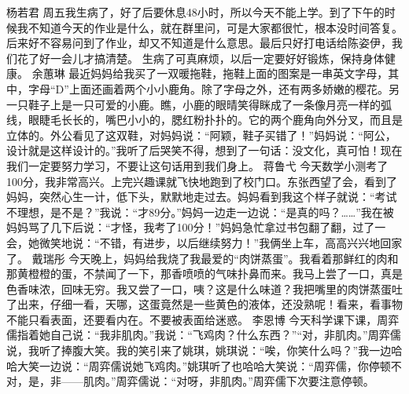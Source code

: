 {}\markdownRendererInterblockSeparator
{}杨若君\markdownRendererInterblockSeparator
{}周五我生病了，好了后要休息48小时，所以今天不能上学。到了下午的时候我不知道今天的作业是什么，就在群里问，可是大家都很忙，根本没时间答复。后来好不容易问到了作业，却又不知道是什么意思。最后只好打电话给陈姿伊，我们花了好一会儿才搞清楚。\markdownRendererInterblockSeparator
{}生病了可真麻烦，以后一定要好好锻炼，保持身体健康。\markdownRendererInterblockSeparator
{}\markdownRendererInterblockSeparator
{}余蕙琳\markdownRendererInterblockSeparator
{}最近妈妈给我买了一双暖拖鞋，拖鞋上面的图案是一串英文字母，其中，字母“D”上面还画着两个小小鹿角。除了字母之外，还有两多娇嫩的樱花。另一只鞋子上是一只可爱的小鹿。瞧，小鹿的眼晴笑得眯成了一条像月亮一样的弧线，眼睫毛长长的，嘴巴小小的，腮红粉扑扑的。它的两个鹿角向外分叉，而且是立体的。外公看见了这双鞋，对妈妈说：“阿颖，鞋子买错了！”妈妈说：“阿公，设计就是这样设计的。”我听了后哭笑不得，想到了一句话：没文化，真可怕！现在我们一定要努力学习，不要让这句话用到我们身上。\markdownRendererInterblockSeparator
{}\markdownRendererInterblockSeparator
{}蒋鲁弋\markdownRendererInterblockSeparator
{}今天数学小测考了100分，我非常高兴。上完兴趣课就飞快地跑到了校门口。东张西望了会，看到了妈妈，突然心生一计，低下头，默默地走过去。妈妈看到我这个样子就说：“考试不理想，是不是？”我说：“才89分。”妈妈一边走一边说：“是真的吗？……”我在被妈妈骂了几下后说：“才怪，我考了100分！”妈妈急忙拿过书包翻了翻，过了一会，她微笑地说：“不错，有进步，以后继续努力！”我俩坐上车，高高兴兴地回家了。\markdownRendererInterblockSeparator
{}\markdownRendererInterblockSeparator
{}戴瑞彤\markdownRendererInterblockSeparator
{}今天晚上，妈妈给我烧了我最爱的“肉饼蒸蛋”。我看着那鲜红的肉和那黄橙橙的蛋，不禁闻了一下，那香喷喷的气味扑鼻而来。我马上尝了一口，真是色香味浓，回味无穷。我又尝了一口，咦？这是什么味道？我把嘴里的肉饼蒸蛋吐了出来，仔细一看，天哪，这蛋竟然是一些黄色的液体，还没熟呢！看来，看事物不能只看表面，还要看内在。不要被表面给迷惑。\markdownRendererInterblockSeparator
{}\markdownRendererInterblockSeparator
{}李恩博\markdownRendererInterblockSeparator
{}今天科学课下课，周弈儒指着她自己说：“我非肌肉。”我说：“飞鸡肉？什么东西？”“对，非肌肉。”周弈儒说，我听了捧腹大笑。我的笑引来了姚琪，姚琪说：“唉，你笑什么吗？”我一边哈哈大笑一边说：“周弈儒说她飞鸡肉。”姚琪听了也哈哈大笑说：“周弈儒，你停顿不对，是，非——肌肉。”周弈儒说：“对呀，非肌肉。”周弈儒下次要注意停顿。\markdownRendererInterblockSeparator
